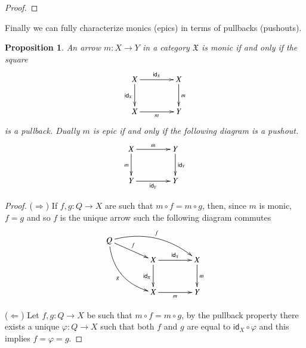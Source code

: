 \documentclass[12pt]{article}
\newtheorem{proposition}[lemma]{Proposition}
\theoremstyle{definition}
\def\X{\mathfrak X}
\numberwithin{equation}{section}
\newcommand{\id}[1]{\mathsf{id}_{#1}}
\begin{document}
\begin{proof}
\end{proof}
Finally we can fully characterize monics (epics) in terms of pullbacks (pushouts).

\begin{proposition}\label{mono_pullback}
An arrow $m:X\rightarrow Y$ in a category $\X$ is monic if and only if the square
\[
\xymatrix@R=10pt@C=40pt{
	X\ar@{}[ddr]\ar[dd]_{\id{X}}\ar[r]^{\id{X}}&X\ar[dd]^m\\
	\\
	X\ar[r]_m&Y
}
\]
is a pullback. Dually $m$ is epic if and only if the following diagram is a pushout.
\[
\xymatrix@R=10pt@C=40pt{
	X\ar@{}[ddr]\ar[dd]_m\ar[r]^m&Y\ar[dd]^{\id{Y}}\\
	\\
	Y\ar[r]_{\id{Y}}&Y
}
\]
\end{proposition}
\begin{proof} ($\Rightarrow$) If $f, g:Q\rightarrow X$ are such that $m\circ f=m\circ g$, then, since $m$ is monic, $f=g$ and so $f$ is the unique arrow such the following diagram commutes
	\begin{equation*}
	\xymatrix@R=10pt@C=40pt{
		Q\ar[dr]^-{f}\ar@/_-15pt/[rrd]^{f}\ar@/_15pt/[rddd]_{g}\\
		&X\ar@{}[ddr]\ar[dd]_{\id{X}}\ar[r]^{\id{X}}&X\ar[dd]^m\\
		\\
		&X\ar[r]_m&Y
	}
\end{equation*} 

	\noindent ($\Leftarrow$) Let  $f, g:Q\rightarrow X$ be such that $m\circ f=m\circ g$, by the pullback property there exists a unique $\varphi:Q\rightarrow X$ such that  both $f$ and $g$ are equal to $\id{X}\circ \varphi$ and this implies $f=\varphi=g$.
\end{proof}
\end{document}
